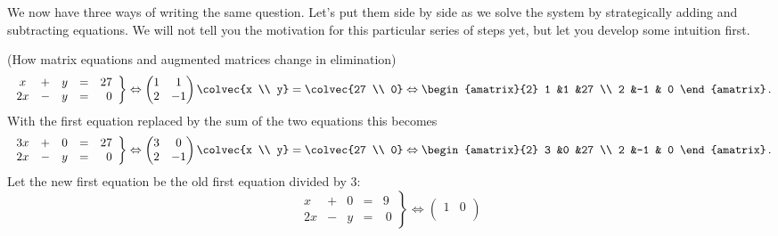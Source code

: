 
We now have three ways of writing the same question. 
Let's put them side by side as we solve the system by strategically adding and subtracting equations. 
We will not tell you the motivation for this particular series of steps yet, but let you develop some intuition first. 

\begin{example}  (How matrix equations and augmented matrices change in elimination)
\[
   \left.
\begin{array}{ccccr}
	x&+&y & = & 27 \\
	2x&-& y & = &\  0 
     \end{array}
   \right\} 
   \Leftrightarrow
    \begin{pmatrix}
      1             &1  \\
      2             &-1
    \end{pmatrix}
  \colvec{x \\ y}
  =
  \colvec{27 \\ 0}
  \Leftrightarrow
 \begin{amatrix}{2}
1 &1 &27 \\ 2 &-1 & 0
\end{amatrix}\, .
\]
With the first equation replaced by the sum of the two equations this becomes
\[
   \left.
\begin{array}{ccccr}
	3x& +& 0 & = & 27 \\
	2x&-& y & = &\  0 
     \end{array}
   \right\} 
   \Leftrightarrow
    \begin{pmatrix}
      3             &0  \\
      2             &-1
    \end{pmatrix}
  \colvec{x \\ y}
  =
  \colvec{27 \\ 0}
  \Leftrightarrow
 \begin{amatrix}{2}
3 &0 &27 \\ 2 &-1 & 0
\end{amatrix}\, .
\]
Let the new first equation be the old first equation divided by 3:
\[
   \left.
\begin{array}{ccccr}
	x& +& 0 & = & 9 \\
	2x&-& y & = &\  0 
     \end{array}
   \right\} 
   \Leftrightarrow
    \begin{pmatrix}
      1             &0  \\

\end{pmatrix}\]
\end{example}
